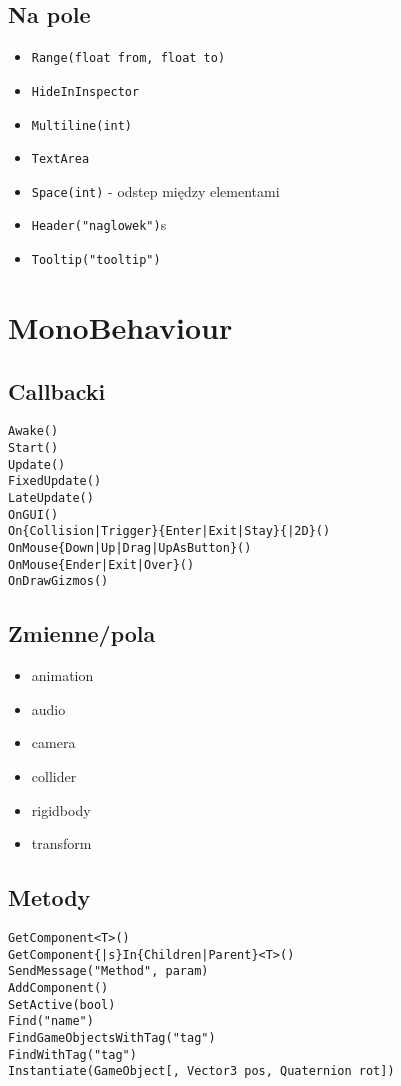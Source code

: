\documentclass{article}
\begin{document}
\subsection{Na pole}
\begin{itemize}
    \item \verb`Range(float from, float to)`
    \item \verb`HideInInspector`
    \item \verb`Multiline(int)`
    \item \verb`TextArea`
    \item \verb`Space(int)` - odstep między elementami
    \item \verb`Header("naglowek")`s
    \item \verb`Tooltip("tooltip")`
\end{itemize}

\section{MonoBehaviour}

\subsection{Callbacki}
\begin{lstlisting}
Awake() 
Start() 
Update() 
FixedUpdate() 
LateUpdate() 
OnGUI() 
On{Collision|Trigger}{Enter|Exit|Stay}{|2D}()
OnMouse{Down|Up|Drag|UpAsButton}()
OnMouse{Ender|Exit|Over}()
OnDrawGizmos()
\end{lstlisting}

\subsection{Zmienne/pola}
\begin{itemize}
    \item animation
    \item audio
    \item camera
    \item collider
    \item rigidbody
    \item transform
\end{itemize}

\subsection{Metody}
\begin{lstlisting}
GetComponent<T>()
GetComponent{|s}In{Children|Parent}<T>()
SendMessage("Method", param)
AddComponent()
SetActive(bool)
Find("name")
FindGameObjectsWithTag("tag")
FindWithTag("tag")
Instantiate(GameObject[, Vector3 pos, Quaternion rot])

\end{lstlisting}
\end{document}
